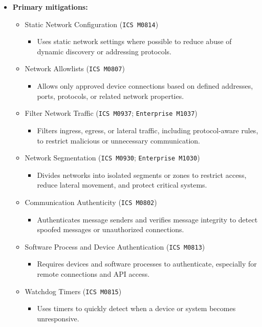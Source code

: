 \documentclass[10pt,a4paper,oneside]{report}
\begin{document}
\begin{itemize}
\item \textbf{Primary mitigations:}
\begin{itemize}
\item Static Network Configuration (\texttt{ICS M0814})
\begin{itemize}
\item Uses static network settings where possible to reduce abuse of dynamic discovery or addressing protocols.
\end{itemize}
\item Network Allowlists (\texttt{ICS M0807})
\begin{itemize}
\item Allows only approved device connections based on defined addresses, ports, protocols, or related network properties.
\end{itemize}
\item Filter Network Traffic (\texttt{ICS M0937}; \texttt{Enterprise M1037})
\begin{itemize}
\item Filters ingress, egress, or lateral traffic, including protocol-aware rules, to restrict malicious or unnecessary communication.
\end{itemize}
\item Network Segmentation (\texttt{ICS M0930}; \texttt{Enterprise M1030})
\begin{itemize}
\item Divides networks into isolated segments or zones to restrict access, reduce lateral movement, and protect critical systems.
\end{itemize}
\item Communication Authenticity (\texttt{ICS M0802})
\begin{itemize}
\item Authenticates message senders and verifies message integrity to detect spoofed messages or unauthorized connections.
\end{itemize}
\item Software Process and Device Authentication (\texttt{ICS M0813})
\begin{itemize}
\item Requires devices and software processes to authenticate, especially for remote connections and API access.
\end{itemize}
\item Watchdog Timers (\texttt{ICS M0815})
\begin{itemize}
\item Uses timers to quickly detect when a device or system becomes unresponsive.
\end{itemize}
\end{itemize}
\end{itemize}
\end{document}
